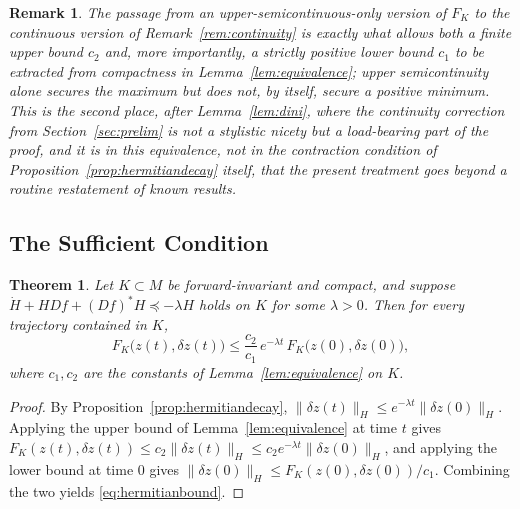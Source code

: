 \documentclass[preprint,12pt,authoryear]{elsarticle}
\newtheorem{theorem}{Theorem}
\newtheorem{remark}{Remark}
\newtheorem{proof}{Proof}
\begin{document}
\begin{remark}
The passage from an upper-semicontinuous-only version of $F_K$ to the continuous version of Remark~\ref{rem:continuity} is exactly what allows both a finite upper bound $c_2$ and, more importantly, a strictly positive lower bound $c_1$ to be extracted from compactness in Lemma~\ref{lem:equivalence}; upper semicontinuity alone secures the maximum but does not, by itself, secure a positive minimum. This is the second place, after Lemma~\ref{lem:dini}, where the continuity correction from Section~\ref{sec:prelim} is not a stylistic nicety but a load-bearing part of the proof, and it is in this equivalence, not in the contraction condition of Proposition~\ref{prop:hermitiandecay} itself, that the present treatment goes beyond a routine restatement of known results.
\end{remark}

\subsection{The Sufficient Condition}

\begin{theorem}
\label{thm:hermitiansufficient}
Let $K\subset M$ be forward-invariant and compact, and suppose $\dot H+HDf+(Df)^*H\preceq-\lambda H$ holds on $K$ for some $\lambda>0$. Then for every trajectory contained in $K$,
\begin{equation}
F_K\big(z(t),\delta z(t)\big) \le \frac{c_2}{c_1}\,e^{-\lambda t}\,F_K\big(z(0),\delta z(0)\big), \label{eq:hermitianbound}
\end{equation}
where $c_1,c_2$ are the constants of Lemma~\ref{lem:equivalence} on $K$.
\end{theorem}

\begin{proof}
By Proposition~\ref{prop:hermitiandecay}, $\|\delta z(t)\|_H\le e^{-\lambda t}\|\delta z(0)\|_H$. Applying the upper bound of Lemma~\ref{lem:equivalence} at time $t$ gives $F_K(z(t),\delta z(t))\le c_2\|\delta z(t)\|_H\le c_2e^{-\lambda t}\|\delta z(0)\|_H$, and applying the lower bound at time $0$ gives $\|\delta z(0)\|_H\le F_K(z(0),\delta z(0))/c_1$. Combining the two yields \eqref{eq:hermitianbound}.
\end{proof}
\end{document}
